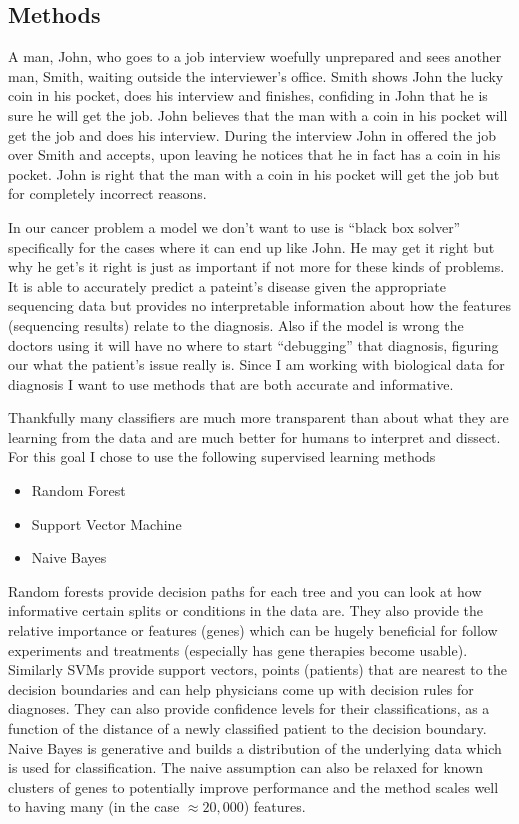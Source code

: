 \subsection{Methods}
A man, John, who goes to a job interview woefully unprepared and sees another man, Smith, waiting outside the interviewer's office.
Smith shows John the lucky coin in his pocket, does his interview and finishes, confiding in John that he is sure he will get the job.
John believes that the man with a coin in his pocket will get the job and does his interview.
During the interview John in offered the job over Smith and accepts, upon leaving he notices that he in fact has a coin in his pocket.
John is right that the man with a coin in his pocket will get the job but for completely incorrect reasons.

In our cancer problem a model we don't want to use is ``black box solver'' specifically for the cases where it can end up like John.
He may get it right but why he get's it right is just as important if not more for these kinds of problems.
It is able to accurately predict a pateint's disease given the appropriate sequencing data but provides no interpretable information about how the features (sequencing results) relate to the diagnosis.
Also if the model is wrong the doctors using it will have no where to start ``debugging'' that diagnosis, figuring our what the patient's issue really is.
Since I am working with biological data for diagnosis I want to use methods that are both accurate and informative.

Thankfully many classifiers are much more transparent than about what they are learning from the data and are much better for humans to interpret and dissect.
For this goal I chose to use the following supervised learning methods
\begin{itemize}
    \item Random Forest
    \item Support Vector Machine
    \item Naive Bayes
\end{itemize}
Random forests provide decision paths for each tree and you can look at how informative certain splits or conditions in the data are.
They also provide the relative importance or features (genes) which can be hugely beneficial for follow experiments and treatments (especially has gene therapies become usable).
Similarly SVMs provide support vectors, points (patients) that are nearest to the decision boundaries and can help physicians come up with decision rules for diagnoses.
They can also provide confidence levels for their classifications, as a function of the distance of a newly classified patient to the decision boundary.
Naive Bayes is generative and builds a distribution of the underlying data which is used for classification.
The naive assumption can also be relaxed for known clusters of genes to potentially improve performance and the method scales well to having many (in the case $\approx 20,000$) features.




